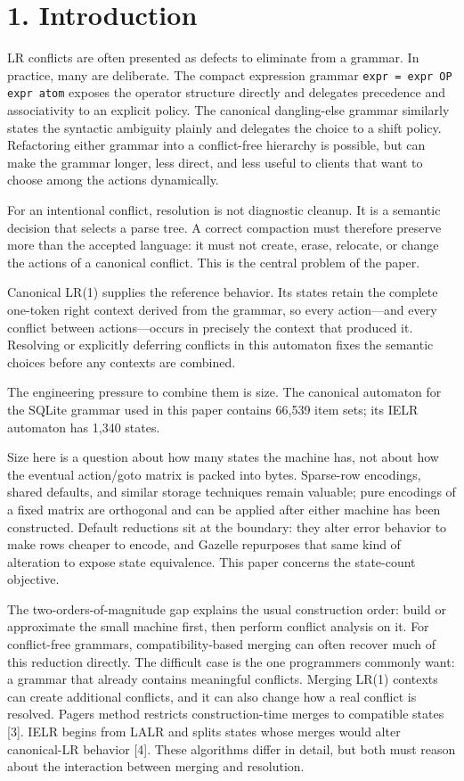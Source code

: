 \documentclass[
  10pt,
]{article}
\begin{document}
\hypertarget{1-introduction}{%
\section{1. Introduction}\label{1-introduction}}

LR conflicts are often presented as defects to eliminate from a grammar.
In practice, many are deliberate. The compact expression grammar
\texttt{expr = expr OP expr \textbar{} atom} exposes the operator
structure directly and delegates precedence and associativity to an
explicit policy. The canonical dangling-else grammar similarly states
the syntactic ambiguity plainly and delegates the choice to a shift
policy. Refactoring either grammar into a conflict-free hierarchy is
possible, but can make the grammar longer, less direct, and less useful
to clients that want to choose among the actions dynamically.

For an intentional conflict, resolution is not diagnostic cleanup. It is
a semantic decision that selects a parse tree. A correct compaction must
therefore preserve more than the accepted language: it must not create,
erase, relocate, or change the actions of a canonical conflict. This is
the central problem of the paper.

Canonical LR(1) supplies the reference behavior. Its states retain the
complete one-token right context derived from the grammar, so every
action---and every conflict between actions---occurs in precisely the
context that produced it. Resolving or explicitly deferring conflicts in
this automaton fixes the semantic choices before any contexts are
combined.

The engineering pressure to combine them is size. The canonical
automaton for the SQLite grammar used in this paper contains 66,539 item
sets; its IELR automaton has 1,340 states.

Size here is a question about how many states the machine has, not about
how the eventual action/goto matrix is packed into bytes. Sparse-row
encodings, shared defaults, and similar storage techniques remain
valuable; pure encodings of a fixed matrix are orthogonal and can be
applied after either machine has been constructed. Default reductions
sit at the boundary: they alter error behavior to make rows cheaper to
encode, and Gazelle repurposes that same kind of alteration to expose
state equivalence. This paper concerns the state-count objective.

The two-orders-of-magnitude gap explains the usual construction order:
build or approximate the small machine first, then perform conflict
analysis on it. For conflict-free grammars, compatibility-based merging
can often recover much of this reduction directly. The difficult case is
the one programmers commonly want: a grammar that already contains
meaningful conflicts. Merging LR(1) contexts can create additional
conflicts, and it can also change how a real conflict is resolved.
Pager\textquotesingle s method restricts construction-time merges to
compatible states {[}3{]}. IELR begins from LALR and splits states whose
merges would alter canonical-LR behavior {[}4{]}. These algorithms
differ in detail, but both must reason about the interaction between
merging and resolution.
\end{document}
